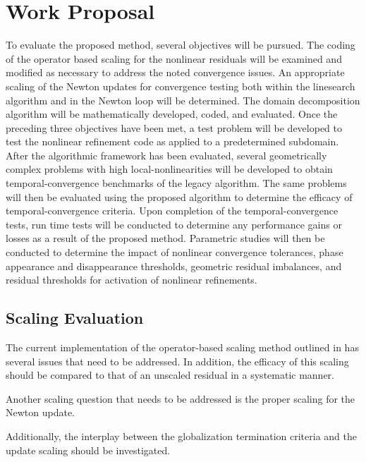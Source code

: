 \chapter{Work Proposal}
\label{chap:proposal}
To evaluate the proposed method, several objectives will be pursued.
The coding of the operator based scaling for the nonlinear residuals will be examined and modified as necessary to address the noted convergence issues.
An appropriate scaling of the Newton updates for convergence testing both within the linesearch algorithm and in the Newton loop will be determined.
The domain decomposition algorithm will be mathematically developed, coded, and evaluated.
Once the preceding three objectives have been met, a test problem will be developed to test the nonlinear refinement code as applied to a predetermined subdomain.
After the algorithmic framework has been evaluated, several geometrically complex problems with high local-nonlinearities will be developed to obtain temporal-convergence benchmarks of the legacy algorithm.
The same problems will then be evaluated using the proposed algorithm to determine the efficacy of temporal-convergence criteria.
Upon completion of the temporal-convergence tests, run time tests will be conducted to determine any performance gains or losses as a result of the proposed method.
Parametric studies will then be conducted to determine the impact of nonlinear convergence tolerances, phase appearance and disappearance thresholds, geometric residual imbalances, and residual thresholds for activation of nonlinear refinements.

\section{Scaling Evaluation}
\label{sect:proposal_scaling}
The current implementation of the operator-based scaling method outlined in  has several issues that need to be addressed.
In addition, the efficacy of this scaling should be compared to that of an unscaled residual in a systematic manner.

Another scaling question that needs to be addressed is the proper scaling for the Newton update.

Additionally, the interplay between the globalization termination criteria and the update scaling should be investigated. 

